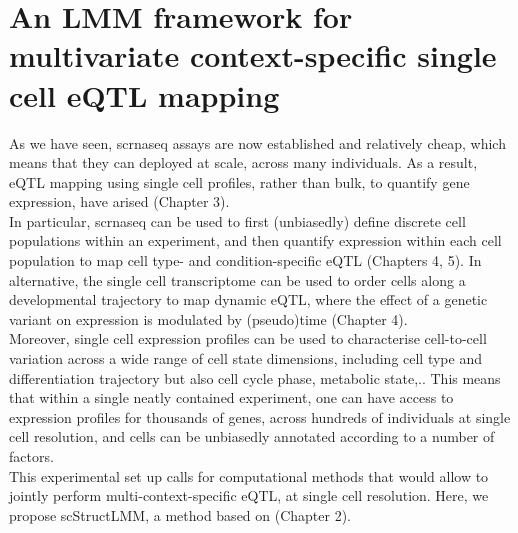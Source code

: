 
\chapter{An LMM framework for multivariate context-specific single cell eQTL mapping}
\label{chapter6}

As we have seen, \gls{scrnaseq} assays are now established and relatively cheap, which means that they can deployed at scale, across many individuals. 
As a result, eQTL mapping using single cell profiles, rather than bulk, to quantify gene expression, have arised (Chapter 3).\\

In particular, \gls{scrnaseq} can be used to first (unbiasedly) define discrete cell populations within an experiment, and then quantify expression within each cell population to map cell type- and condition-specific eQTL (Chapters 4, 5).
In alternative, the single cell transcriptome can be used to order cells along a developmental trajectory to map dynamic eQTL, where the effect of a genetic variant on expression is modulated by (pseudo)time (Chapter 4). \\


Moreover, single cell expression profiles can be used to characterise cell-to-cell variation across a wide range of cell state dimensions,
including cell type and differentiation trajectory but also cell cycle phase, metabolic state,..
This means that within a single neatly contained experiment, one can have access to expression profiles for thousands of genes, across hundreds of individuals at single cell resolution, and cells can be unbiasedly annotated according to a number of factors. \\

This experimental set up calls for computational methods that would allow to jointly perform multi-context-specific eQTL, at single cell resolution.
Here, we propose scStructLMM, a method based on (Chapter 2).

